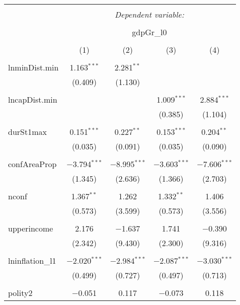 \begin{table}[!htbp] \centering 
  \caption{} 
  \label{} 
\begin{tabular}{@{\extracolsep{5pt}}lcccc} 
\\[-1.8ex]\hline 
\hline \\[-1.8ex] 
 & \multicolumn{4}{c}{\textit{Dependent variable:}} \\ 
\cline{2-5} 
\\[-1.8ex] & \multicolumn{4}{c}{gdpGr\_l0} \\ 
\\[-1.8ex] & (1) & (2) & (3) & (4)\\ 
\hline \\[-1.8ex] 
 lnminDist.min & 1.163$^{***}$ & 2.281$^{**}$ &  &  \\ 
  & (0.409) & (1.130) &  &  \\ 
  & & & & \\ 
 lncapDist.min &  &  & 1.009$^{***}$ & 2.884$^{***}$ \\ 
  &  &  & (0.385) & (1.104) \\ 
  & & & & \\ 
 durSt1max & 0.151$^{***}$ & 0.227$^{**}$ & 0.153$^{***}$ & 0.204$^{**}$ \\ 
  & (0.035) & (0.091) & (0.035) & (0.090) \\ 
  & & & & \\ 
 confAreaProp & $-$3.794$^{***}$ & $-$8.995$^{***}$ & $-$3.603$^{***}$ & $-$7.606$^{***}$ \\ 
  & (1.345) & (2.636) & (1.366) & (2.703) \\ 
  & & & & \\ 
 nconf & 1.367$^{**}$ & 1.262 & 1.332$^{**}$ & 1.406 \\ 
  & (0.573) & (3.599) & (0.573) & (3.556) \\ 
  & & & & \\ 
 upperincome & 2.176 & $-$1.637 & 1.741 & $-$0.390 \\ 
  & (2.342) & (9.430) & (2.300) & (9.316) \\ 
  & & & & \\ 
 lninflation\_l1 & $-$2.020$^{***}$ & $-$2.984$^{***}$ & $-$2.087$^{***}$ & $-$3.030$^{***}$ \\ 
  & (0.499) & (0.727) & (0.497) & (0.713) \\ 
  & & & & \\ 
 polity2 & $-$0.051 & 0.117 & $-$0.073 & 0.118 \\ 

\end{tabular}
\end{table}
